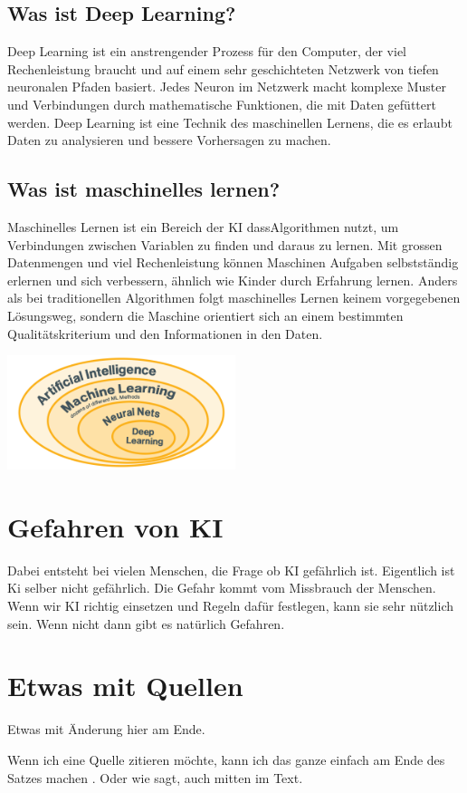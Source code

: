 \documentclass{report}
\begin{document}
\subsection{Was ist Deep Learning?}
Deep Learning ist ein anstrengender Prozess für den Computer, der viel Rechenleistung braucht und auf einem sehr geschichteten Netzwerk von tiefen neuronalen Pfaden basiert. Jedes Neuron im Netzwerk macht komplexe Muster und Verbindungen durch mathematische Funktionen, die mit Daten gefüttert werden. Deep Learning ist eine Technik des maschinellen Lernens, die es erlaubt Daten zu analysieren und bessere Vorhersagen zu machen.

\subsection{Was ist maschinelles lernen?}
Maschinelles Lernen ist ein Bereich der KI dassAlgorithmen nutzt, um Verbindungen zwischen Variablen zu finden und daraus zu lernen. Mit grossen Datenmengen und viel Rechenleistung können Maschinen Aufgaben selbstständig erlernen und sich verbessern, ähnlich wie Kinder durch Erfahrung lernen. Anders als bei traditionellen Algorithmen folgt maschinelles Lernen keinem vorgegebenen Lösungsweg, sondern die Maschine orientiert sich an einem bestimmten Qualitätskriterium und den Informationen in den Daten. 



\includegraphics[width=0.5\textwidth]{Training.png}

\section{Gefahren von KI}
Dabei entsteht bei vielen Menschen, die Frage ob KI gefährlich ist. Eigentlich ist Ki selber nicht gefährlich. Die Gefahr kommt vom Missbrauch der Menschen. Wenn wir KI richtig einsetzen und Regeln dafür festlegen, kann sie sehr nützlich sein. Wenn nicht dann gibt es natürlich Gefahren.





\section{Etwas mit Quellen}

Etwas mit Änderung hier am Ende.

Wenn ich eine Quelle zitieren möchte, kann ich das ganze einfach am Ende des Satzes machen \citep{example}. Oder wie \citet{example} sagt, auch mitten im Text.

\printbibliography
\end{document}
